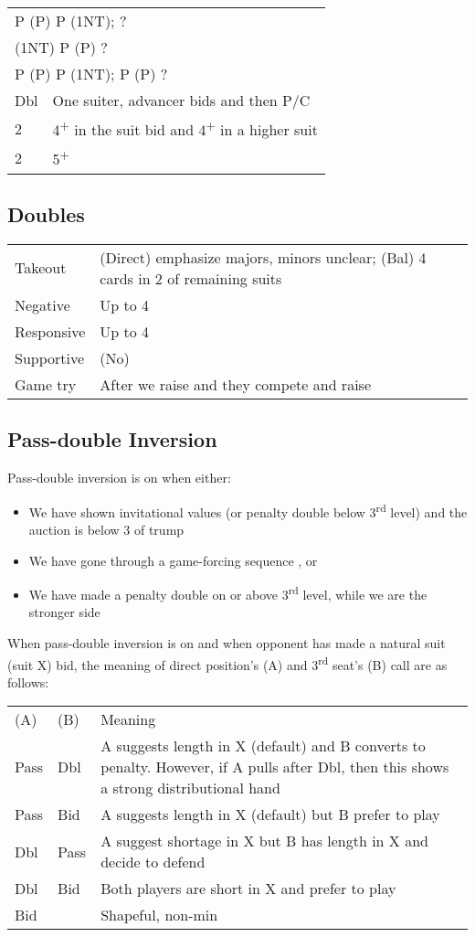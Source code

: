 \documentclass{article}
\renewcommand{\sp}{\ensuremath\spadesuit}
\newcommand{\he}{\ensuremath\heartsuit}
\newcommand{\di}{\ensuremath\diamondsuit}
\newcommand{\cl}{\ensuremath\clubsuit}
\newcommand{\nt}{\relsize{-1}NT\relsize{1}}
\newcommand{\up}{\textsuperscript{+}}
\begin{document}
\begin{tabular}{|l|p{6.5cm}}
	\multicolumn{2}{l}{P (P) P (1\nt{}); ?} \\
	\multicolumn{2}{l}{(1\nt{}) P (P) ?} \\
	\multicolumn{2}{l}{P (P) P (1\nt{}); P (P) ?} \\
    Dbl & One suiter, advancer bids and then P/C \\
    2\cl{}/\di{}/\he{} & 4\up{} in the suit bid and 4\up{} in a higher suit \\
    2\sp{} & 5\up\sp{} Constructive \\
\end{tabular}

\subsection{Doubles}

\begin{tabular}{|l|p{6.5cm}}
    Takeout & (Direct) emphasize majors, minors unclear; (Bal) 4 cards in 2 of remaining suits \\
    Negative & Up to 4\he{}\\
    Responsive & Up to 4\he{}\\
    Supportive & (No) \\
    Game try & After we raise and they compete and raise \\
\end{tabular}

\subsection{Pass-double Inversion}
Pass-double inversion is on when either:
\begin{itemize}
\itemsep0em
	\item We have shown invitational values (or penalty double below 3\textsuperscript{rd} level) and the auction is below 3 of trump
	\item We have gone through a game-forcing sequence , or
	\item We have made a penalty double on or above 3\textsuperscript{rd} level, while we are the stronger side
\end{itemize}
When pass-double inversion is on and when opponent has made a natural suit (suit X) bid, the meaning of direct position's (A) and 3\textsuperscript{rd} seat's (B) call are as follows: \\
\begin{tabular}{|l|l|p{6cm}}
	(A) & (B) & Meaning \\
	Pass & Dbl & A suggests length in X (default) and B converts to penalty. However, if A pulls after Dbl, then this shows a strong distributional hand \\
	Pass & Bid & A suggests length in X (default) but B prefer to play \\
	Dbl & Pass & A suggest shortage in X but B has length in X and decide to defend \\
	Dbl & Bid & Both players are short in X and prefer to play \\
	Bid & & Shapeful, non-min
\end{tabular}
\end{document}

